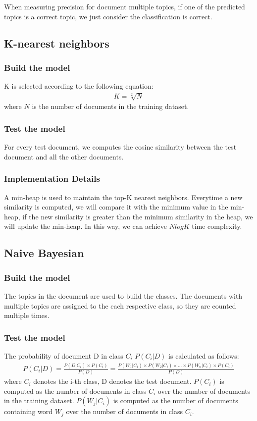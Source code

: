 \documentclass{article}
\begin{document}
When measuring precision for document multiple topics, if one of the predicted
topics is a correct topic, we just consider the classification is correct.

\subsection{K-nearest neighbors}
\subsubsection{Build the model}
K is selected according to the following equation:
\begin{align*}K = \sqrt[2]{N}\end{align*}
where $N$ is the number of documents in the training dataset.
\subsubsection{Test the model}
For every test document, we computes the cosine similarity between the test document and all the other documents.
\subsubsection{Implementation Details}
A min-heap is used to maintain the top-K nearest neighbors. Everytime a new similarity is computed, we will compare it with the minimum value in the min-heap, if the new similarity is greater than the minimum similarity in the heap, we will update the min-heap. In this way, we can achieve $Nlog K$ time complexity.
\subsection{Naive Bayesian}
\subsubsection{Build the model}
The topics in the document are used to build the classes. The documents with multiple topics are assigned to the each respective class, so they are counted multiple times. 
\subsubsection{Test the model}
The probability of document D in class $C_i$ $P(C_i|D)$ is calculated as follows:
\begin{align*}
P(C_i|D) = \frac{P(D|C_i) \times P(C_i)}{P(D)}
	 = \frac{P(W_1|C_i) \times P(W_2|C_i) \times ... \times P(W_n|C_i) \times P(C_i)}{P(D)}				
\end{align*}
where $C_i$ denotes the i-th class, D denotes the test document. $P(C_i)$ is computed as the number of documents in class $C_i$ over the number of documents in the training dataset. $P(W_j|C_i)$ is computed as the number of documents containing word $W_j$ over the number of documents in class $C_i$.
\end{document}
